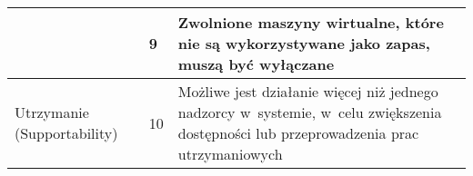 \documentclass[../wstep.tex]{subfiles}
\begin{document}
\begin{longtable}{|p{}|p{}|p{}|}
                                                    & 9            & Zwolnione maszyny wirtualne, które nie są wykorzystywane jako zapas, muszą być wyłączane                                                                                                                                   \\ \hline
    \multirow[t]{3}{=}{Utrzymanie (Supportability)} & 10           & Możliwe jest działanie więcej niż jednego nadzorcy w~systemie, w~celu zwiększenia dostępności lub przeprowadzenia prac utrzymaniowych                                                                                      \\
\end{longtable}
\end{document}
